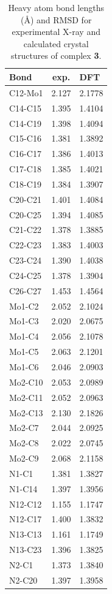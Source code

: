 \begin{table}[]
\centering
\caption{Heavy atom bond lengths (\AA) and RMSD for experimental X-ray and calculated crystal structures of complex \textbf{3}.} \label{tab:bondlengths3}
\begin{tabular}{lcl}
\textbf{Bond} & \textbf{exp.} & \textbf{DFT} \\ \hline
C12-Mo1 & 2.127 & 2.1778 \\
C14-C15 & 1.395 & 1.4104 \\
C14-C19 & 1.398 & 1.4094 \\
C15-C16 & 1.381 & 1.3892 \\
C16-C17 & 1.386 & 1.4013 \\
C17-C18 & 1.385 & 1.4021 \\
C18-C19 & 1.384 & 1.3907 \\
C20-C21 & 1.401 & 1.4084 \\
C20-C25 & 1.394 & 1.4085 \\
C21-C22 & 1.378 & 1.3885 \\
C22-C23 & 1.383 & 1.4003 \\
C23-C24 & 1.390 & 1.4038 \\
C24-C25 & 1.378 & 1.3904 \\
C26-C27 & 1.453 & 1.4564 \\
Mo1-C2 & 2.052 & 2.1024 \\
Mo1-C3 & 2.020 & 2.0675 \\
Mo1-C4 & 2.056 & 2.1078 \\
Mo1-C5 & 2.063 & 2.1201 \\
Mo1-C6 & 2.046 & 2.0903 \\
Mo2-C10 & 2.053 & 2.0989 \\
Mo2-C11 & 2.052 & 2.0963 \\
Mo2-C13 & 2.130 & 2.1826 \\
Mo2-C7 & 2.044 & 2.0925 \\
Mo2-C8 & 2.022 & 2.0745 \\
Mo2-C9 & 2.068 & 2.1158 \\
N1-C1 & 1.381 & 1.3827 \\
N1-C14 & 1.397 & 1.3956 \\
N12-C12 & 1.155 & 1.1747 \\
N12-C17 & 1.400 & 1.3832 \\
N13-C13 & 1.161 & 1.1749 \\
N13-C23 & 1.396 & 1.3825 \\
N2-C1 & 1.373 & 1.3840 \\
N2-C20 & 1.397 & 1.3958 \\

\end{tabular}
\end{table}
